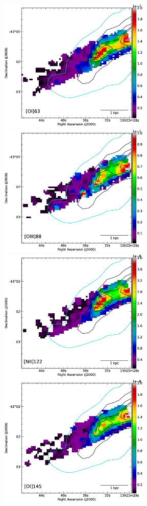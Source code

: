 \documentclass[preprint2]{aastex}
\begin{document}
\begin{figure}
 \includegraphics[width=7.2cm]{CenA_OI63_unconvolved_image_v1_cropped}
 \includegraphics[width=7.2cm]{CenA_OIII88_unconvolved_image_v1_cropped}
 \includegraphics[width=7.2cm]{CenA_NII122_unconvolved_image_v1_cropped}
 \includegraphics[width=7.2cm]{CenA_OI145_unconvolved_image_v1_cropped}

\end{figure}
\end{document}
